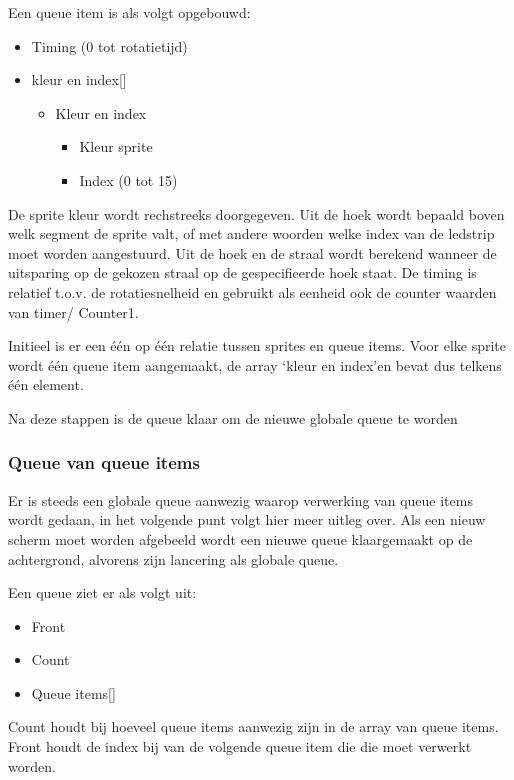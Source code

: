 \documentclass[12pt]{ugentreport}
\begin{document}
Een queue item is als volgt opgebouwd:
\begin{itemize}
	\item Timing (0 tot rotatietijd)
	\item kleur en index[]
	\begin{itemize}
		\item Kleur en index
			\begin{itemize}
				\item Kleur sprite
				\item Index (0 tot 15)
			\end{itemize}
	\end{itemize}
\end{itemize}

De sprite kleur wordt rechstreeks doorgegeven. Uit de hoek wordt bepaald boven welk segment de sprite valt, of met andere woorden welke 
index van de ledstrip moet worden aangestuurd. Uit de hoek en de straal wordt berekend wanneer de uitsparing op de gekozen straal op de 
gespecifieerde hoek staat. De timing is relatief t.o.v. de rotatiesnelheid en gebruikt als eenheid ook de counter waarden van timer/
Counter1.

Initieel is er een één op één relatie tussen sprites en queue items. Voor elke sprite wordt één queue item aangemaakt, de array ‘kleur 
en index’en bevat dus telkens één element.

Na deze stappen is de queue klaar om de nieuwe globale queue te worden


\subsubsection{Queue van queue items}
Er is steeds een globale queue aanwezig waarop verwerking van queue items wordt gedaan, in het volgende punt volgt hier meer uitleg 
over. Als een nieuw scherm moet worden afgebeeld wordt een nieuwe queue klaargemaakt op de achtergrond, alvorens zijn lancering als 
globale queue.

Een queue ziet er als volgt uit:
\begin{itemize}
	\item Front
	\item Count
	\item Queue items[]
\end{itemize}

Count houdt bij hoeveel queue items aanwezig zijn in de array van queue items. Front houdt de index bij van de volgende queue item die 
die moet verwerkt worden.
\end{document}
